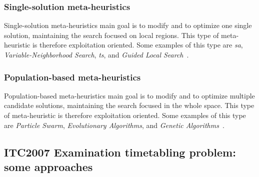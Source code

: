 \subsubsection{Single-solution meta-heuristics}
Single-solution meta-heuristics main goal is to modify and to optimize one single solution, maintaining the search focused on local regions. This type of meta-heuristic is therefore exploitation oriented. Some examples of this type are \textit{\gls{sa}}, \textit{Variable-Neighborhood Search}, \textit{\gls{ts}}, and \textit{Guided Local Search}~\cite{Talbi2009}. 

\subsubsection{Population-based meta-heuristics}
Population-based meta-heuristics main goal is to modify and to optimize multiple candidate solutions, maintaining the search focused in the whole space. This type of meta-heuristic is therefore exploitation oriented. Some examples of this type are \textit{Particle Swarm}, \textit{Evolutionary Algorithms}, and \textit{Genetic Algorithms}~\cite{Talbi2009}.

\subsection{ITC2007 Examination timetabling problem: some approaches}
\label{subsec:ApprITC2007}

